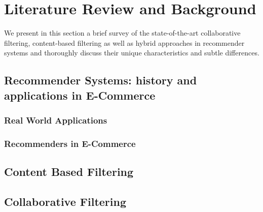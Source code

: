 
\chapter{Literature Review and Background} %
\label{Chapter2} %

We present in this section a brief survey of the state-of-the-art collaborative filtering, content-based filtering as well as hybrid  approaches in recommender systems and thoroughly discuss their unique characteristics and subtle differences.  




\section{Recommender Systems: history and applications in E-Commerce}
\label{chp2-sec1}

\subsection{Real World Applications}
\label{chp2-sec1.1}



\subsection{Recommenders in E-Commerce}
\label{chp2-sec1.2}

\section{Content Based Filtering}
\label{chp2-sec2}

\section{Collaborative Filtering}
\label{chp2-sec3}

